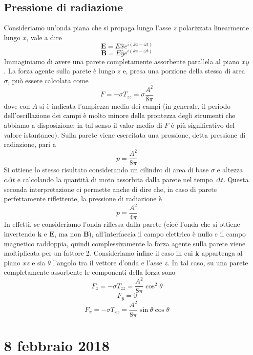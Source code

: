 \documentclass[a4paper,11pt]{book}
\renewcommand{\vec}[1]{\mathbf{#1}}
\theoremstyle{theorem}
\theoremstyle{definition}
\begin{document}
\subsection{Pressione di radiazione}
Consideriamo un'onda piana che si propaga lungo l'asse $z$ polarizzata linearmente lungo $x$, vale a dire
\[\vec{E}=E\hat{x}e^{i(kz-\omega t)}\]
\[\vec{B}=E\hat{y}e^{i(kz-\omega t)}\]
Immaginiamo di avere una parete completamente assorbente parallela al piano $xy$. La forza agente sulla parete è lungo $z$ e, presa una porzione della stessa di area $\sigma$, può essere calcolata come
\[F=-\sigma T_{zz}=\sigma\frac{A^2}{8\pi}\]
dove con $A$ si è indicata l'ampiezza media dei campi (in generale, il periodo dell'oscillazione dei campi è molto minore della prontezza degli strumenti che abbiamo a disposizione: in tal senso il valor medio di $F$ è più significativo del valore istantaneo). Sulla parete viene esercitata una pressione, detta pressione di radiazione, pari a
\[p=\frac{A^2}{8\pi}\]
Si ottiene lo stesso risultato considerando un cilindro di area di base $\sigma$ e altezza $c\Delta t$ e calcolando la quantità di moto assorbita dalla parete nel tempo $\Delta t$. Questa seconda interpretazione ci permette anche di dire che, in caso di parete perfettamente riflettente, la pressione di radiazione è
\[p=\frac{A^2}{4\pi}\]
In effetti, se consideriamo l'onda riflessa dalla parete (cioè l'onda che si ottiene invertendo $\vec{k}$ e $\vec{E}$, ma non $\vec{B}$), all'interfaccia il campo elettrico è nullo e il campo magnetico raddoppia, quindi complessivamente la forza agente sulla parete viene moltiplicata per un fattore 2. Consideriamo infine il caso in cui $\vec{k}$ appartenga al piano $xz$ e sia $\theta$ l'angolo tra il vettore d'onda e l'asse $z$. In tal caso, su una parete completamente assorbente le componenti della forza sono
\[F_z=-\sigma T_{zz}=\frac{A^2}{8\pi}\cos^2\theta\]
\[F_y=0\]
\[F_x=-\sigma T_{xz}=\frac{A^2}{8\pi}\sin\theta\cos\theta\]
\newpage
\section{8 febbraio 2018}
\end{document}
